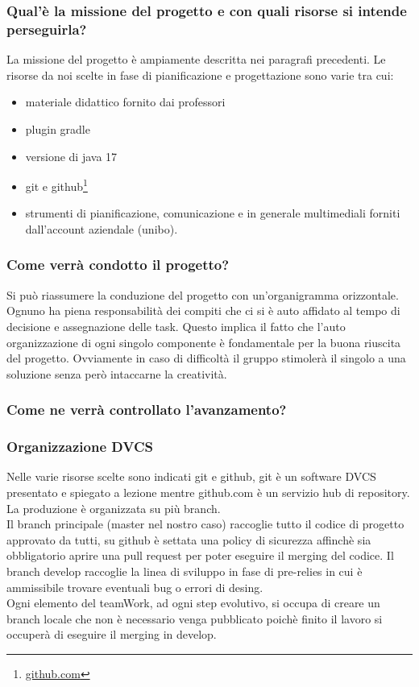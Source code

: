 \documentclass[a4paper,12pt]{report}
\begin{document}
\subsubsection{Qual'è la missione del progetto e con quali risorse si intende perseguirla?}
La missione del progetto è ampiamente descritta nei paragrafi precedenti.
Le risorse da noi scelte in fase di pianificazione e progettazione sono varie tra cui:
\begin{itemize}
    \item materiale didattico fornito dai professori
    \item plugin gradle
    \item versione di java 17
    \item git e github\footnote{\url{github.com}}
    \item strumenti di pianificazione, comunicazione e in generale multimediali forniti dall'account aziendale (unibo).
\end{itemize}

\subsubsection{Come verrà condotto il progetto?}
Si può riassumere la conduzione del progetto con un'organigramma orizzontale.
Ognuno ha piena responsabilità dei compiti che ci si è auto affidato al tempo di decisione e assegnazione delle task.
Questo implica il fatto che l'auto organizzazione di ogni singolo componente è fondamentale per la buona riuscita del progetto.
Ovviamente in caso di difficoltà il gruppo stimolerà il singolo a una soluzione senza però intaccarne la creatività.
\subsubsection{Come ne verrà controllato l'avanzamento?}
\subsubsection{Organizzazione DVCS}
Nelle varie risorse scelte sono indicati git e github, git è un software DVCS presentato e spiegato a lezione mentre github.com è un servizio
hub di repository.
La produzione è organizzata su più branch.
\\Il branch principale (master nel nostro caso) raccoglie tutto il codice di progetto approvato da tutti, su github è settata una policy
di sicurezza affinchè sia obbligatorio aprire una pull request per poter eseguire il merging del codice.
Il branch develop raccoglie la linea di sviluppo in fase di pre-relies in cui è ammissibile trovare eventuali bug o errori di desing.
\\Ogni elemento del teamWork, ad ogni step evolutivo, si occupa di creare un branch locale che non è necessario venga pubblicato poichè finito
il lavoro si occuperà di eseguire il merging  in develop.
\end{document}
